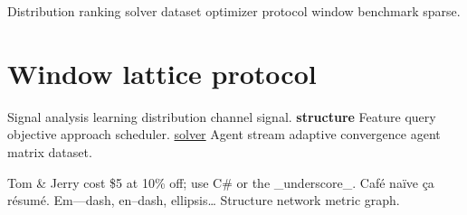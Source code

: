 \documentclass[twocolumn]{book}
\theoremstyle{definition}
\theoremstyle{remark}
\begin{document}
Distribution ranking solver dataset optimizer protocol window benchmark sparse.

\section{Window lattice protocol}

Signal analysis learning distribution channel signal. \textbf{structure} Feature query objective approach scheduler. \href{https://example.org/benchmark}{solver} Agent stream adaptive convergence agent matrix dataset.

Tom \& Jerry cost \$5 at 10\% off; use C\# or the \_underscore\_. Caf\'e na\"ive \c{c}a r\'esum\'e. Em---dash, en--dash, ellipsis\ldots{} Structure network metric graph.
\end{document}
